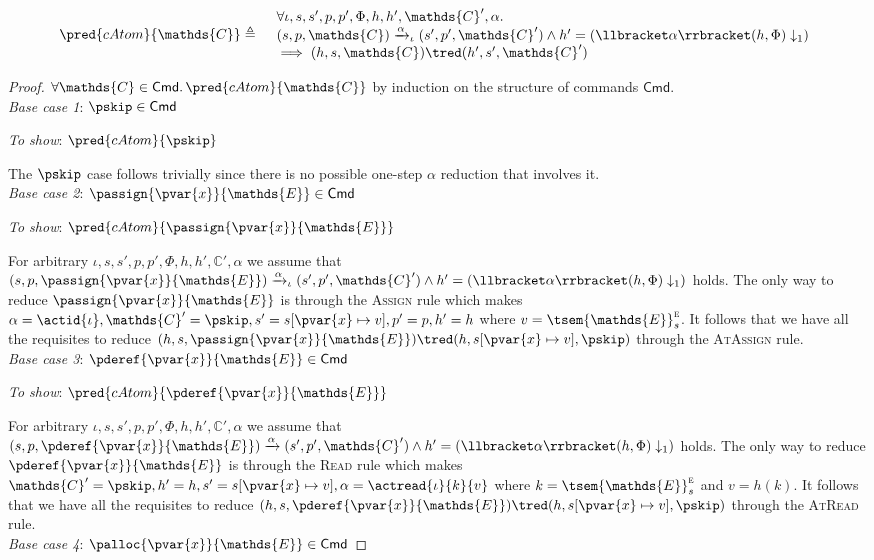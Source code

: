 \begin{lem}
	\label{lem:catom}
	\[
	\begin{array}{r l}
		\pred{cAtom}{\mathds{C}} \triangleq&
		\begin{array}{l}
		\forall \iota, s, s', p, p', \Phi, h, h', \mathds{C}', \alpha \ldotp \\
		(s, p, \mathds{C}) \xrightarrow{\alpha}_\iota (s', p', \mathds{C}') \land h' = \left( \llbracket \alpha \rrbracket(h, \Phi) \downarrow_1 \right) \\
		\implies
		(h, s, \mathds{C}) \tred (h', s', \mathds{C}')
		\end{array}
	\end{array}
	\]
	
	{\parindent0pt
	\begin{proof}
	$\forall \mathds{C} \in \mathsf{Cmd} \ldotp \pred{cAtom}{\mathds{C}}$ by induction on the structure of commands $\mathsf{Cmd}$. \\
	\indline
	\textit{Base case 1}: $\pskip \in \mathsf{Cmd}$
	
	\textit{To show}: $\pred{cAtom}{\pskip}$
	
	The $\pskip$ case follows trivially since there is no possible one-step $\alpha$ reduction that involves it. \\
	\indline
	\textit{Base case 2}: $\passign{\pvar{x}}{\mathds{E}} \in \mathsf{Cmd}$
	
	\textit{To show}: $\pred{cAtom}{\passign{\pvar{x}}{\mathds{E}}}$
	
	For arbitrary $\iota, s, s', p, p', \Phi, h, h', \mathds{C}', \alpha$ we assume that $(s, p, \passign{\pvar{x}}{\mathds{E}}) \xrightarrow{\alpha}_\iota (s', p', \mathds{C}') \land h' = \left( \llbracket \alpha \rrbracket(h, \Phi) \downarrow_1 \right)$ holds. The only way to reduce $\passign{\pvar{x}}{\mathds{E}}$ is through the \textsc{Assign} rule which makes $\alpha = \actid{\iota}, \mathds{C}' = \pskip, s' = s[\pvar{x} \mapsto v], p' = p, h' = h$ where $v = \tsem{\mathds{E}}_s^\textsc{e}$. It follows that we have all the requisites to reduce $(h, s, \passign{\pvar{x}}{\mathds{E}}) \tred (h, s[\pvar{x} \mapsto v], \pskip)$ through the \textsc{AtAssign} rule. \\
	\indline
	\textit{Base case 3}: $\pderef{\pvar{x}}{\mathds{E}} \in \mathsf{Cmd}$
	
	\textit{To show}: $\pred{cAtom}{\pderef{\pvar{x}}{\mathds{E}}}$
	
	For arbitrary $\iota, s, s', p, p', \Phi, h, h', \mathds{C}', \alpha$ we assume that $(s, p, \pderef{\pvar{x}}{\mathds{E}}) \xrightarrow{\alpha} (s', p', \mathds{C}') \land h' = \left( \llbracket \alpha \rrbracket(h, \Phi) \downarrow_1 \right)$ holds. The only way to reduce $\pderef{\pvar{x}}{\mathds{E}}$ is through the \textsc{Read} rule which makes $\mathds{C}' = \pskip, h' = h, s' = s[\pvar{x} \mapsto v], \alpha = \actread{\iota}{k}{v}$ where $k = \tsem{\mathds{E}}_s^\textsc{e}$ and $v = h(k)$. It follows that we have all the requisites to reduce $(h, s, \pderef{\pvar{x}}{\mathds{E}}) \tred (h, s[\pvar{x} \mapsto v], \pskip)$ through the \textsc{AtRead} rule. \\
	\indline
	\textit{Base case 4}: $\palloc{\pvar{x}}{\mathds{E}} \in \mathsf{Cmd}$
	

\end{proof}}
\end{lem}
